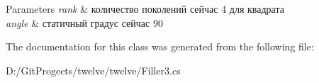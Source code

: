 \begin{DoxyParams}{Parameters}
{\em rank} & количество поколений сейчас 4 для квадрата\\
\hline
{\em angle} & статичный градус сейчас 90\\
\hline
\end{DoxyParams}


The documentation for this class was generated from the following file\+:\begin{DoxyCompactItemize}
\item 
D\+:/\+Git\+Progects/twelve/twelve/Filler3.\+cs\end{DoxyCompactItemize}
